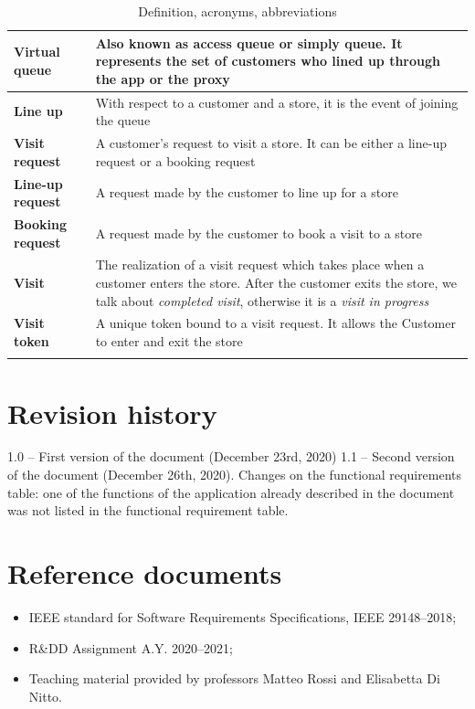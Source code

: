 \documentclass[a4paper,oneside,11pt]{book}   %
\begin{document}
\begin{longtable}[c] { |>{\bfseries{}}C{0.25\textwidth}|H{0.55\textwidth}| }
        Virtual queue & Also known as access queue or simply queue. It represents the set of customers who lined up through the app or the proxy \\ \hline
        Line up & With respect to a customer and a store, it is the event of joining the queue \\ \hline
        Visit request & A customer’s request to visit a store. It can be either a line-up request or a booking request \\ \hline
        Line-up request & A request made by the customer  to line up for a store \\ \hline
        Booking request & A request made by the customer  to book a visit to a store \\ \hline 
        Visit & The realization of a visit request which takes place when a customer enters the store. After the customer exits the store, we talk about \textit{completed visit}, otherwise it is a \textit{visit in progress} \\ \hline
        Visit token & A unique token bound to a visit request. It allows the Customer to enter and exit the store \\
        \hline
    \caption{Definition, acronyms, abbreviations}
    \label{table:definitions_acronyms_abbreviations}
    \end{longtable} %
    
    \section{Revision history}
    1.0 -- First version of the document (December 23rd, 2020)
    1.1 -- Second version of the document (December 26th, 2020). Changes on the functional requirements table: one of the functions of the application already described in the document was not listed in the functional requirement table.
    
    \section{Reference documents}
    \begin{itemize}
        \item IEEE standard for Software Requirements Specifications, IEEE 29148--2018;
        \item R\&DD Assignment A.Y. 2020--2021;
        \item Teaching material provided by professors Matteo Rossi and Elisabetta Di Nitto.
    \end{itemize}
\end{document}
